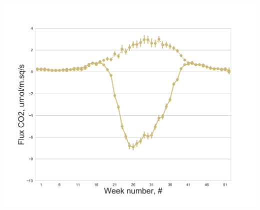 \documentclass{beamer}
\begin{document}
\begin{frame}
\begin{columns}[t]
\includegraphics[width=\textwidth]{FvsW_day/US-Los.png}
\end{columns}

\end{frame}
\end{document}
